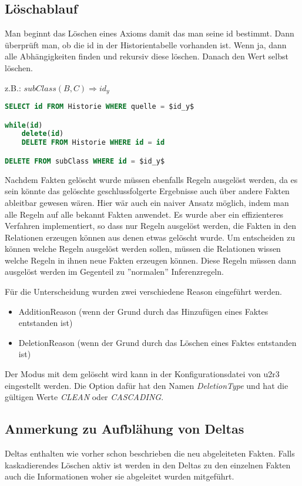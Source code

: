 \subsection{Löschablauf}
Man beginnt das Löschen eines Axioms damit das man seine id bestimmt. Dann überprüft man, ob die id in der Historientabelle vorhanden ist. Wenn ja, dann alle Abhängigkeiten finden und rekursiv diese löschen. Danach den Wert selbst löschen. 

z.B.: $subClass(B,C) \Rightarrow id_y$
\begin{lstlisting}[language=SQL]
SELECT id FROM Historie WHERE quelle = $id_y$

while(id)
	delete(id)
	DELETE FROM Historie WHERE id = id

DELETE FROM subClass WHERE id = $id_y$
\end{lstlisting}


Nachdem Fakten gelöscht wurde müssen ebenfalls Regeln ausgelöst werden, da es sein könnte das gelöschte geschlussfolgerte Ergebnisse auch über andere Fakten ableitbar gewesen wären. 
Hier wär auch ein naiver Ansatz möglich, indem man alle Regeln auf alle bekannt Fakten anwendet. Es wurde aber ein effizienteres Verfahren implementiert, so dass nur Regeln ausgelöst werden, die Fakten in den Relationen erzeugen können aus denen etwas gelöscht wurde.
Um entscheiden zu können welche Regeln ausgelöst werden sollen, müssen die Relationen wissen welche Regeln in ihnen neue Fakten erzeugen können. Diese Regeln müssen dann ausgelöst werden im Gegenteil zu ''normalen'' Inferenzregeln.

Für die Unterscheidung wurden zwei verschiedene Reason eingeführt werden.
\begin{itemize}
  \item AdditionReason (wenn der Grund durch das Hinzufügen eines Faktes entstanden ist)
  \item DeletionReason (wenn der Grund durch das Löschen eines Faktes entstanden ist)
\end{itemize}

Der Modus mit dem gelöscht wird kann in der Konfigurationsdatei von u2r3 eingestellt werden. Die Option dafür hat den Namen \emph{DeletionType} und hat die gültigen Werte \emph{CLEAN} oder \emph{CASCADING}.

\subsection{Anmerkung zu Aufblähung von Deltas}
\label{abschnitt-aufblaehung}
Deltas enthalten wie vorher schon beschrieben die neu abgeleiteten Fakten. Falls kaskadierendes Löschen aktiv ist werden in den Deltas zu den einzelnen Fakten auch die Informationen woher sie abgeleitet wurden mitgeführt.

